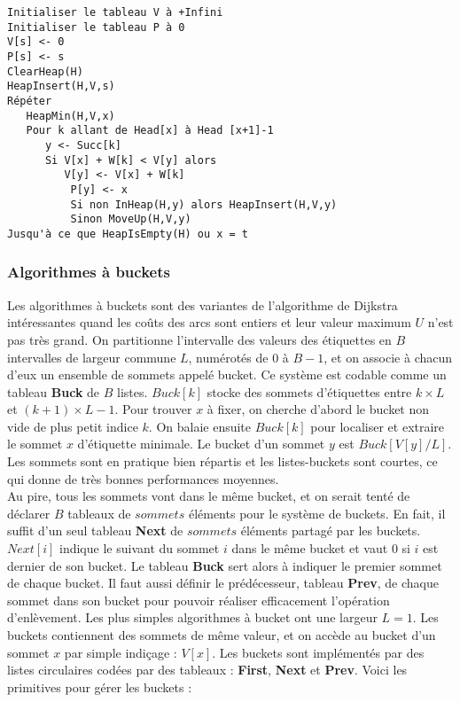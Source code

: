 \documentclass{article}
\begin{document}
\begin{verbatim}
Initialiser le tableau V à +Infini
Initialiser le tableau P à 0
V[s] <- 0
P[s] <- s
ClearHeap(H)
HeapInsert(H,V,s)
Répéter
   HeapMin(H,V,x)
   Pour k allant de Head[x] à Head [x+1]-1
      y <- Succ[k]
      Si V[x] + W[k] < V[y] alors
         V[y] <- V[x] + W[k]
          P[y] <- x
          Si non InHeap(H,y) alors HeapInsert(H,V,y)
          Sinon MoveUp(H,V,y)
Jusqu'à ce que HeapIsEmpty(H) ou x = t
\end{verbatim}

\subsubsection{Algorithmes à buckets}

Les algorithmes à buckets sont des variantes de l’algorithme de Dijkstra intéressantes quand les coûts des arcs sont entiers et leur valeur maximum $U$ n’est pas très grand. On 
partitionne l’intervalle des valeurs des étiquettes en $B$ intervalles de largeur commune $L$, numérotés de $0$ à $B-1$, et on associe à chacun d’eux un ensemble de sommets 
appelé bucket. Ce système est codable comme un tableau \textbf{Buck} de $B$ listes. $Buck[k]$ stocke des sommets d’étiquettes entre $k\times L$ et $(k+1)\times L-1$. Pour 
trouver $x$ à fixer, on cherche d’abord le bucket non vide de plus petit indice $k$. On balaie ensuite $Buck[k]$ pour localiser et extraire le sommet $x$ d’étiquette minimale.
Le bucket d’un sommet $y$ est $Buck[V[y]/L]$. Les sommets sont en pratique bien répartis et les listes-buckets sont courtes, ce qui donne de très bonnes performances 
moyennes. \\

\noindent Au pire, tous les sommets vont dans le même bucket, et on serait tenté de déclarer $B$ tableaux de $sommets$ éléments pour le système de buckets. En fait, il suffit 
d’un seul tableau \textbf{Next} de $sommets$ éléments partagé par les buckets. $Next[i]$ indique le suivant du sommet $i$ dans le même bucket et vaut $0$ si $i$ est dernier 
de son bucket. Le tableau \textbf{Buck} sert alors à indiquer le premier sommet de chaque bucket. Il faut aussi définir le prédécesseur, tableau \textbf{Prev}, de chaque sommet 
dans son bucket pour pouvoir réaliser efficacement l’opération d’enlèvement. Les plus simples algorithmes à bucket ont une largeur $L=1$. Les buckets contiennent des sommets de 
même valeur, et on accède au bucket d’un sommet $x$ par simple indiçage : $V[x]$. Les buckets sont implémentés par des listes circulaires codées par des tableaux : 
\textbf{First}, \textbf{Next} et \textbf{Prev}. Voici les primitives pour gérer les buckets : 
\end{document}
